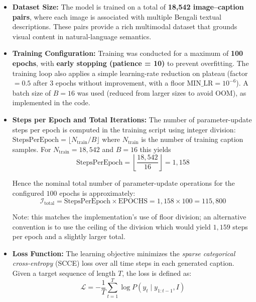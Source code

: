 \begin{itemize}
    \item \textbf{Dataset Size:}
    The model is trained on a total of \textbf{18,542 image--caption pairs}, where each image is associated with multiple Bengali textual descriptions. These pairs provide a rich multimodal dataset that grounds visual content in natural-language semantics.

    \item \textbf{Training Configuration:}
    Training was conducted for a maximum of \textbf{100 epochs}, with \textbf{early stopping (patience = 10)} to prevent overfitting. The training loop also applies a simple learning-rate reduction on plateau (factor $=0.5$ after $3$ epochs without improvement, with a floor $\text{MIN\_LR}=10^{-6}$). A batch size of $B = 16$ was used (reduced from larger sizes to avoid OOM), as implemented in the code.

    \item \textbf{Steps per Epoch and Total Iterations:}
    The number of parameter-update steps per epoch is computed in the training script using integer division: $\text{StepsPerEpoch}=\lfloor N_{\text{train}} / B\rfloor$ where $N_{\text{train}}$ is the number of training caption samples. For $N_{\text{train}}=18,542$ and $B=16$ this yields
    \begin{equation}
        \text{StepsPerEpoch} = \left\lfloor\frac{18,542}{16}\right\rfloor = 1,158
    \end{equation}

    Hence the nominal total number of parameter-update operations for the configured $100$ epochs is approximately:
    \begin{equation}
        \mathcal{I}_{\text{total}} = \text{StepsPerEpoch} \times \text{EPOCHS} = 1,158 \times 100 = 115{,}800
    \end{equation}

    Note: this matches the implementation's use of floor division; an alternative convention is to use the ceiling of the division which would yield $1,159$ steps per epoch and a slightly larger total.

    

    \item \textbf{Loss Function:}
    The learning objective minimizes the \textit{sparse categorical cross-entropy} (SCCE) loss over all time steps in each generated caption. Given a target sequence of length $T$, the loss is defined as:
    \begin{equation}
        \mathcal{L} = -\frac{1}{T} \sum_{t=1}^{T} \log P(y_t \mid y_{1:t-1}, I)
    \end{equation}
    

\end{itemize}
